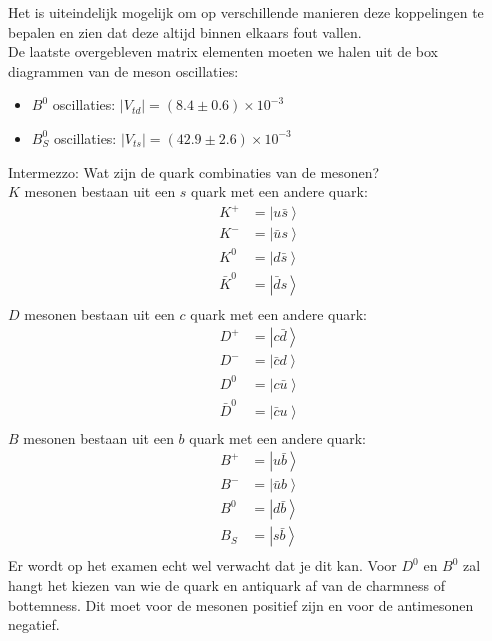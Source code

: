 \documentclass[../main.tex]{subfiles}
\begin{document}
Het is uiteindelijk mogelijk om op verschillende manieren deze koppelingen te bepalen en zien dat deze altijd binnen elkaars fout vallen.\\
De laatste overgebleven matrix elementen moeten we halen uit de box diagrammen van de meson oscillaties:
\begin{itemize}
    \item $B^0$ oscillaties: $\left|V_{t d}\right|=(8.4 \pm 0.6) \times 10^{-3}$
    \item $B_S^0$ oscillaties: $\left|V_{t s}\right|=(42.9 \pm 2.6) \times 10^{-3}$
\end{itemize}
{\color{blue} Intermezzo: Wat zijn de quark combinaties van de mesonen?\\
    $K$ mesonen bestaan uit een $s$ quark met een andere quark:
    \begin{equation}
        \begin{aligned}
            \label{eq:k_meson_samenstelling}
            K^+ &= \left| u\bar{s}\right>\\
            K^- &= \left| \bar{u}s\right>\\
            K^0 &= \left| d\bar{s}\right>\\
            \bar{K}^0 &= \left| \bar{d}s\right>\\
        \end{aligned}
    \end{equation}
    $D$ mesonen bestaan uit een $c$ quark met een andere quark:
    \begin{equation}
        \begin{aligned}
            \label{eq:d_meson_samenstelling}
            D^+ &= \left| c\bar{d}\right>\\
            D^- &= \left| \bar{c}d\right>\\
            D^0 &= \left| c\bar{u}\right>\\
            \bar{D}^0 &= \left| \bar{c}u\right>\\
        \end{aligned}
    \end{equation}
    $B$ mesonen bestaan uit een $b$ quark met een andere quark:
    \begin{equation}
        \begin{aligned}
            \label{eq:d_meson_samenstelling}
            B^+ &= \left| u\bar{b}\right>\\
            B^- &= \left| \bar{u}b\right>\\
            B^0 &= \left| d\bar{b}\right>\\
            B_S &= \left| s\bar{b}\right>\\
        \end{aligned}
    \end{equation}
    Er wordt op het examen echt wel verwacht dat je dit kan. Voor $D^0$ en $B^0$ zal hangt het kiezen van wie de quark en antiquark af van de charmness of bottemness. Dit moet voor de mesonen positief zijn en voor de antimesonen negatief.
}
\end{document}
